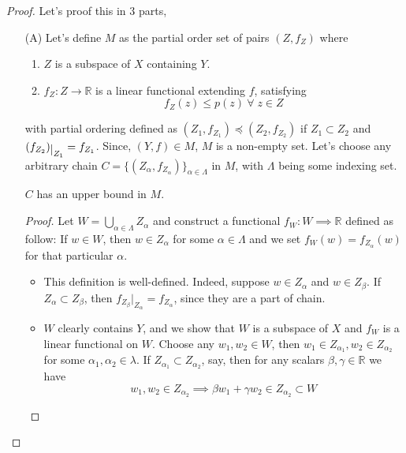 \documentclass[11pt,a4paper]{article}
\begin{document}
\begin{proof}
    Let's proof this in 3 parts,
    \begin{enumerate}
        \item[(A)] Let's define $M$ as the partial order set of pairs $(Z, f_Z)$ where
        \begin{enumerate}
            \item $Z$ is a subspace of $X$ containing $Y$.
            \item $f_Z : Z \to \mathbb{R}$ is a linear functional extending $f$, satisfying 
            $$ 
                f_Z(z) \leq p(z)\ \forall\; z \in Z
            $$
        \end{enumerate}
        with partial ordering defined as $(Z_1, f_{Z_1}) \preccurlyeq (Z_2, f_{Z_2})$ if $Z_1 \subset Z_2$ and $(f_{Z_2})\restrict{Z_1} = f_{Z_1}$. Since, $(Y, f) \in M$, $M$ is a non-empty set. Let's choose any arbitrary chain $C = \{ (Z_\alpha, f_{Z_\alpha})\}_{\alpha \in \Lambda}$ in $M$, with $\Lambda$ being some indexing set.
        
        \begin{lemma}
            $C$ has an upper bound in $M$.
        \end{lemma}
        
        \begin{proof}
            Let $W = \bigcup_{\alpha \in \Lambda} Z_{\alpha}$ and construct a functional $f_{W} : W \implies \mathbb{R}$ defined as follow: If $w \in W$, then $w \in Z_{\alpha}$ for some $\alpha \in \Lambda$ and we set $f_{W}(w) = f_{Z_{\alpha}}(w)$ for that particular $\alpha$.
            \begin{itemize}
                \item This definition is well-defined. Indeed, suppose $w \in Z_{\alpha}$ and $w \in Z_{\beta}$. If $Z_{\alpha} \subset Z_{\beta}$, then $f_{Z_{\beta}}|_{Z_{\alpha}} = f_{Z_{\alpha}}$, since they are a part of chain.
                \item $W$ clearly contains $Y$, and we show that $W$ is a subspace of $X$ and $f_W$ is a linear functional on $W$. Choose any $w_1,w_2 \in W$, then $w_1 \in Z_{\alpha_1},w_2 \in Z_{\alpha_2}$ for some $\alpha_1, \alpha_2 \in \lambda$. If $Z_{\alpha_1} \subset Z_{\alpha_2}$, say, then for any scalars $\beta, \gamma \in \mathbb{R}$ we have
                $$
                    w_1, w_2 \in Z_{\alpha_2} \implies \beta w_1 + \gamma w_2 \in Z_{\alpha_2} \subset W
                $$
                

\end{itemize}
\end{proof}
\end{enumerate}
\end{proof}
\end{document}
